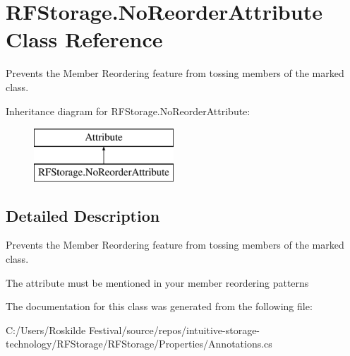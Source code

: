 \section{R\+F\+Storage.\+No\+Reorder\+Attribute Class Reference}
\label{class_r_f_storage_1_1_no_reorder_attribute}


Prevents the Member Reordering feature from tossing members of the marked class.  


Inheritance diagram for R\+F\+Storage.\+No\+Reorder\+Attribute\+:\begin{figure}[H]
\begin{center}
\leavevmode
\includegraphics[height=2.000000cm]{class_r_f_storage_1_1_no_reorder_attribute}
\end{center}
\end{figure}


\subsection{Detailed Description}
Prevents the Member Reordering feature from tossing members of the marked class. 

The attribute must be mentioned in your member reordering patterns 

The documentation for this class was generated from the following file\+:\begin{DoxyCompactItemize}
\item 
C\+:/\+Users/\+Roskilde Festival/source/repos/intuitive-\/storage-\/technology/\+R\+F\+Storage/\+R\+F\+Storage/\+Properties/Annotations.\+cs\end{DoxyCompactItemize}
